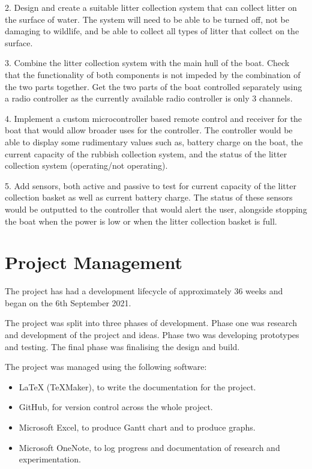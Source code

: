 \documentclass [11pt]{article}
\begin{document}
2.	Design and create a suitable litter collection system that can collect litter on the surface of water. The system will need to be able to be turned off, not be damaging to wildlife, and be able to collect all types of litter that collect on the surface. 

3.	Combine the litter collection system with the main hull of the boat. Check that the functionality of both components is not impeded by the combination of the two parts together. Get the two parts of the boat controlled separately using a radio controller as the currently available radio controller is only 3 channels.

4.	Implement a custom microcontroller based remote control and receiver for the boat that would allow broader uses for the controller. The controller would be able to display some rudimentary values such as, battery charge on the boat, the current capacity of the rubbish collection system, and the status of the litter collection system (operating/not operating).

5.	Add sensors, both active and passive to test for current capacity of the litter collection basket as well as current battery charge. The status of these sensors would be outputted to the controller that would alert the user, alongside stopping the boat when the power is low or when the litter collection basket is full.  

\section{Project Management}

The project has had a development lifecycle of approximately 36 weeks and began on the 6th September 2021.

The project was split into three phases of development. Phase one was research and development of the project and ideas. Phase two was developing prototypes and testing. The final phase was finalising the design and build. 

The project was managed using the following software: 

\begin{itemize}

\item{LaTeX (TeXMaker), to write the documentation for the project.}
\item{GitHub, for version control across the whole project.}
\item{Microsoft Excel, to produce Gantt chart and to produce graphs.}
\item{Microsoft OneNote, to log progress and documentation of research and experimentation.}

\end{itemize}
\end{document}
